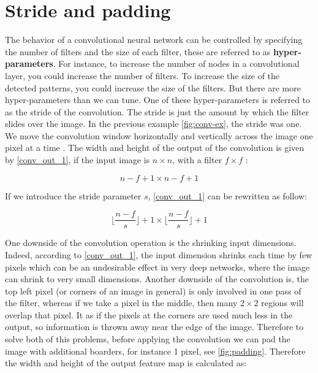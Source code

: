 \section{Stride and padding}
The behavior of a convolutional neural network can be controlled by specifying the number of filters and the size of each filter, these are referred
to as \textbf{hyper-parameters}. For instance, to increase the number of nodes in a convolutional layer, you could increase the number of filters.
To increase the size of the detected patterns, you could increase the size of the filters. But there are more hyper-parameters than we can tune.
One of these hyper-parameters is referred to as the stride of the convolution. The stride is just the amount by which the filter slides over the
image. In the previous example \cref{fig:conv-ex}, the stride was one. We move the convolution window horizontally and vertically  across the image
one pixel at a time \cite{ud188}. The width and height of the output of the convolution is given by \cref{conv_out_1}, if the input image is $n \times n$,
with a filter $f \times f$ :

\begin{equation}
  \label{conv_out_1}
  n - f + 1 \times n - f + 1
\end{equation}

If we introduce the stride parameter $s$, \cref{conv_out_1} can be rewritten as follow:

\begin{equation}
  \label{conv_out_2}
  \lfloor\frac{n - f}{s}\rfloor + 1\times \lfloor\frac{n - f}{s}\rfloor + 1
\end{equation}


One downside of the convolution operation is the shrinking input dimensions. Indeed, according to \cref{conv_out_1}, the input dimension shrinks
each time by few pixels which can be an undesirable effect in very deep networks, where the image can shrink to very small dimensions. Another
downside of the convolution is, the top left pixel (or corners of an image in general) is only involved in one pass of the filter, whereas if we
take a pixel in the middle, then many $2 \times 2$ regions will overlap that pixel. It as if the pixels at the corners are used much less in the
output, so information is thrown away near the edge of the image. Therefore to solve both of this problems, before applying the convolution we can
pad the image with additional boarders, for instance 1 pixel, see \cref{fig:padding}. Therefore the width and height of the output feature map is
calculated as:

